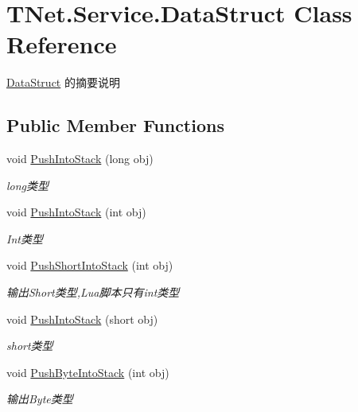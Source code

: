 \hypertarget{class_t_net_1_1_service_1_1_data_struct}{}\section{T\+Net.\+Service.\+Data\+Struct Class Reference}
\label{class_t_net_1_1_service_1_1_data_struct}


\mbox{\hyperlink{class_t_net_1_1_service_1_1_data_struct}{Data\+Struct}} 的摘要说明  


\subsection*{Public Member Functions}
\begin{DoxyCompactItemize}
\item 
void \mbox{\hyperlink{class_t_net_1_1_service_1_1_data_struct_a3e6950c8ae4fa96f7099a5a3f8e6aede}{Push\+Into\+Stack}} (long obj)
\begin{DoxyCompactList}\small\item\em long类型 \end{DoxyCompactList}\item 
void \mbox{\hyperlink{class_t_net_1_1_service_1_1_data_struct_a25de7eb1bb1933e93fed547e8ad46fd2}{Push\+Into\+Stack}} (int obj)
\begin{DoxyCompactList}\small\item\em Int类型 \end{DoxyCompactList}\item 
void \mbox{\hyperlink{class_t_net_1_1_service_1_1_data_struct_ab992444dced4bc0d37d8b243d957f295}{Push\+Short\+Into\+Stack}} (int obj)
\begin{DoxyCompactList}\small\item\em 输出\+Short类型,Lua脚本只有int类型 \end{DoxyCompactList}\item 
void \mbox{\hyperlink{class_t_net_1_1_service_1_1_data_struct_a69d7b863ca374cca2b7ad70a8ffb567f}{Push\+Into\+Stack}} (short obj)
\begin{DoxyCompactList}\small\item\em short类型 \end{DoxyCompactList}\item 
void \mbox{\hyperlink{class_t_net_1_1_service_1_1_data_struct_aca8ed13cadfc07669205e6c3aa69b28d}{Push\+Byte\+Into\+Stack}} (int obj)
\begin{DoxyCompactList}\small\item\em 输出\+Byte类型 \end{DoxyCompactList}\item 

\end{DoxyCompactItemize}

